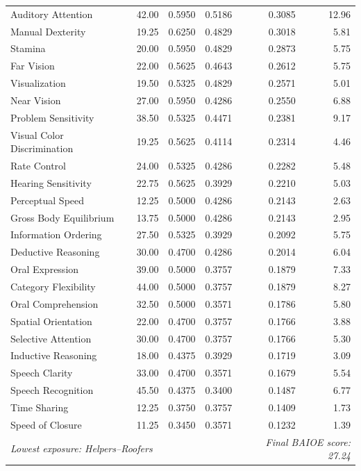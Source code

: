 \begin{longtable}{lrrrrr}
Auditory Attention & 42.00 & 0.5950 & 0.5186 & 0.3085 & 12.96 \\
Manual Dexterity & 19.25 & 0.6250 & 0.4829 & 0.3018 & 5.81 \\
Stamina & 20.00 & 0.5950 & 0.4829 & 0.2873 & 5.75 \\
Far Vision & 22.00 & 0.5625 & 0.4643 & 0.2612 & 5.75 \\
Visualization & 19.50 & 0.5325 & 0.4829 & 0.2571 & 5.01 \\
Near Vision & 27.00 & 0.5950 & 0.4286 & 0.2550 & 6.88 \\
Problem Sensitivity & 38.50 & 0.5325 & 0.4471 & 0.2381 & 9.17 \\
Visual Color Discrimination & 19.25 & 0.5625 & 0.4114 & 0.2314 & 4.46 \\
Rate Control & 24.00 & 0.5325 & 0.4286 & 0.2282 & 5.48 \\
Hearing Sensitivity & 22.75 & 0.5625 & 0.3929 & 0.2210 & 5.03 \\
Perceptual Speed & 12.25 & 0.5000 & 0.4286 & 0.2143 & 2.63 \\
Gross Body Equilibrium & 13.75 & 0.5000 & 0.4286 & 0.2143 & 2.95 \\
Information Ordering & 27.50 & 0.5325 & 0.3929 & 0.2092 & 5.75 \\
Deductive Reasoning & 30.00 & 0.4700 & 0.4286 & 0.2014 & 6.04 \\
Oral Expression & 39.00 & 0.5000 & 0.3757 & 0.1879 & 7.33 \\
Category Flexibility & 44.00 & 0.5000 & 0.3757 & 0.1879 & 8.27 \\
Oral Comprehension & 32.50 & 0.5000 & 0.3571 & 0.1786 & 5.80 \\
Spatial Orientation & 22.00 & 0.4700 & 0.3757 & 0.1766 & 3.88 \\
Selective Attention & 30.00 & 0.4700 & 0.3757 & 0.1766 & 5.30 \\
Inductive Reasoning & 18.00 & 0.4375 & 0.3929 & 0.1719 & 3.09 \\
Speech Clarity & 33.00 & 0.4700 & 0.3571 & 0.1679 & 5.54 \\
Speech Recognition & 45.50 & 0.4375 & 0.3400 & 0.1487 & 6.77 \\
Time Sharing & 12.25 & 0.3750 & 0.3757 & 0.1409 & 1.73 \\
Speed of Closure & 11.25 & 0.3450 & 0.3571 & 0.1232 & 1.39 \\
\multicolumn{4}{l}{\textit{Lowest exposure: Helpers--Roofers}} & \multicolumn{2}{r}{\textit{Final BAIOE score: 27.24}} \\

\end{longtable}
